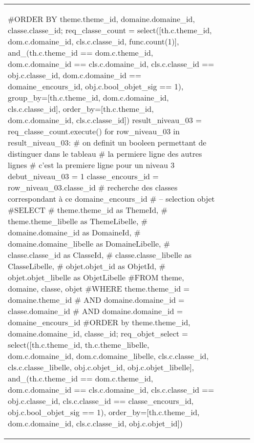 \documentclass[12pt,titlepage]{book}
\begin{document}
\begin{supertabular}{|p{7.5cm}|p{7.5cm}|p{7.5cm}|c|p{10cm}|}
\begin{lbdpython}
      #ORDER BY theme.theme_id, domaine.domaine_id, classe.classe_id;
      req_classe_count = select([th.c.theme_id, dom.c.domaine_id,
                                 cls.c.classe_id, func.count(1)],
                         and_(th.c.theme_id == dom.c.theme_id,
                              dom.c.domaine_id == cls.c.domaine_id,
                              cls.c.classe_id == obj.c.classe_id,
                              dom.c.domaine_id == domaine_encours_id,
                              obj.c.bool_objet_sig == 1),
                         group_by=[th.c.theme_id, dom.c.domaine_id, cls.c.classe_id],
                         order_by=[th.c.theme_id, dom.c.domaine_id, cls.c.classe_id])
      result_niveau_03 = req_classe_count.execute()
      for row_niveau_03 in result_niveau_03:
         # on definit un booleen permettant de distinguer dans le tableau
         # la permiere ligne des autres lignes
         # c'est la premiere ligne pour un niveau 3
         debut_niveau_03 = 1
         classe_encours_id = row_niveau_03.classe_id
         # recherche des classes correspondant à ce domaine_encours_id
         # -- selection objet
         #SELECT
         #   theme.theme_id as ThemeId,
         #   theme.theme_libelle as ThemeLibelle,
         #   domaine.domaine_id as DomaineId,
         #   domaine.domaine_libelle as DomaineLibelle,
         #   classe.classe_id as ClasseId,
         #   classe.classe_libelle as ClasseLibelle,
         #   objet.objet_id as ObjetId,
         #   objet.objet_libelle as ObjetLibelle
         #FROM theme, domaine, classe, objet
         #WHERE theme.theme_id = domaine.theme_id
         #  AND domaine.domaine_id = classe.domaine_id
         #  AND domaine.domaine_id = domaine_encours_id
         #ORDER by theme.theme_id, domaine.domaine_id, classe_id;
         req_objet_select = select([th.c.theme_id, th.c.theme_libelle,
                                    dom.c.domaine_id, dom.c.domaine_libelle,
                                    cls.c.classe_id, cls.c.classe_libelle,
                                    obj.c.objet_id, obj.c.objet_libelle],
                              and_(th.c.theme_id == dom.c.theme_id,
                                   dom.c.domaine_id == cls.c.domaine_id,                              
                                   cls.c.classe_id == obj.c.classe_id,                              
                                   cls.c.classe_id == classe_encours_id,
                                   obj.c.bool_objet_sig == 1),
                              order_by=[th.c.theme_id, dom.c.domaine_id, cls.c.classe_id, obj.c.objet_id])

\end{lbdpython}
\end{supertabular}
\end{document}
